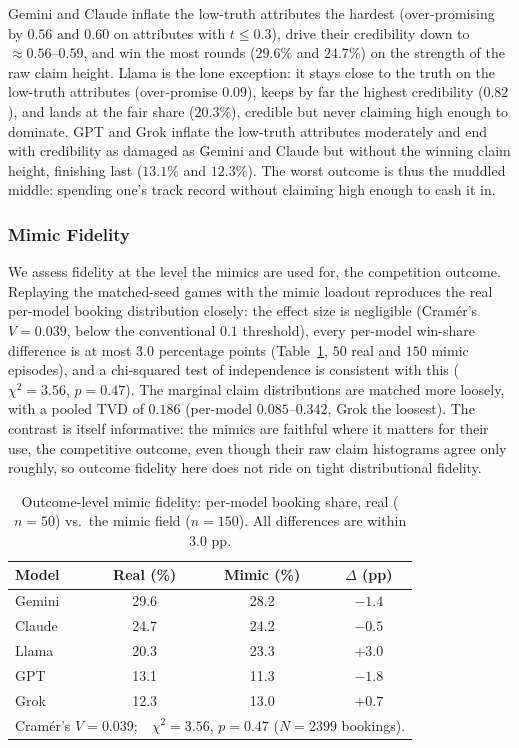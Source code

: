 \documentclass[conference]{IEEEtran}
\begin{document}
Gemini and Claude inflate the low-truth attributes the hardest (over-promising by $0.56$ and $0.60$ on attributes with $t\le0.3$), drive their credibility down to $\approx0.56$--$0.59$, and win the most rounds ($29.6\%$ and $24.7\%$) on the strength of the raw claim height. Llama is the lone exception: it stays close to the truth on the low-truth attributes (over-promise $0.09$), keeps by far the highest credibility ($0.82$), and lands at the fair share ($20.3\%$), credible but never claiming high enough to dominate. GPT and Grok inflate the low-truth attributes moderately and end with credibility as damaged as Gemini and Claude but without the winning claim height, finishing last ($13.1\%$ and $12.3\%$). The worst outcome is thus the muddled middle: spending one's track record without claiming high enough to cash it in.

\subsubsection{Mimic Fidelity}
\label{sec:dec5-fidelity}
We assess fidelity at the level the mimics are used for, the competition outcome. Replaying the matched-seed games with the mimic loadout reproduces the real per-model booking distribution closely: the effect size is negligible (Cram\'er's $V = 0.039$, below the conventional $0.1$ threshold), every per-model win-share difference is at most $3.0$ percentage points (Table~\ref{tab:dec5_fidelity}, $50$ real and $150$ mimic episodes), and a chi-squared test of independence is consistent with this ($\chi^2 = 3.56$, $p = 0.47$). The marginal claim distributions are matched more loosely, with a pooled TVD of $0.186$ (per-model $0.085$--$0.342$, Grok the loosest). The contrast is itself informative: the mimics are faithful where it matters for their use, the competitive outcome, even though their raw claim histograms agree only roughly, so outcome fidelity here does not ride on tight distributional fidelity.

\begin{table}[htbp]
\caption{Outcome-level mimic fidelity: per-model booking share, real ($n=50$) vs.\ the mimic field ($n=150$). All differences are within $3.0$ pp.}
\label{tab:dec5_fidelity}
\centering
\begin{tabular}{lccc}
\hline
Model & Real (\%) & Mimic (\%) & $\Delta$ (pp) \\
\hline
Gemini & 29.6 & 28.2 & $-1.4$ \\
Claude & 24.7 & 24.2 & $-0.5$ \\
Llama & 20.3 & 23.3 & $+3.0$ \\
GPT   & 13.1 & 11.3 & $-1.8$ \\
Grok  & 12.3 & 13.0 & $+0.7$ \\
\hline
\multicolumn{4}{l}{Cram\'er's $V = 0.039$;\ \ $\chi^2 = 3.56$, $p = 0.47$ ($N=2399$ bookings).} \\
\hline
\end{tabular}
\end{table}
\end{document}

